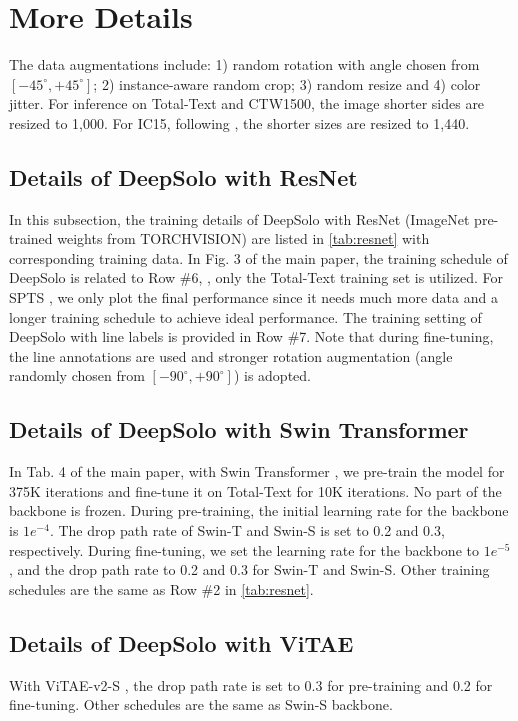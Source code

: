 \documentclass[10pt,twocolumn,letterpaper]{article}
\begin{document}
\section{More Details}
\label{sec:more_details}

The data augmentations include: 1) random rotation with angle chosen from $[-45^{\circ}, +45^{\circ}]$; 2) instance-aware random crop; 3) random resize and 4) color jitter. For inference on Total-Text and CTW1500, the image shorter sides are resized to 1,000. For IC15, following \cite{liao2020mask,zhang2022text}, the shorter sizes are resized to 1,440.

\subsection{Details of DeepSolo with ResNet}
In this subsection, the training details of DeepSolo with ResNet \cite{he2016deep} (ImageNet pre-trained weights from TORCHVISION) are listed in \cref{tab:resnet} with corresponding training data. In Fig. 3 of the main paper, the training schedule of DeepSolo is related to Row \#6, \ie, only the Total-Text training set is utilized. For SPTS \cite{peng2022spts}, we only plot the final performance since it needs much more data and a longer training schedule to achieve ideal performance. The training setting of DeepSolo with line labels is provided in Row \#7. Note that during fine-tuning, the line annotations are used and stronger rotation augmentation (angle randomly chosen from $[-90^{\circ}, +90^{\circ}]$) is adopted.

\subsection{Details of DeepSolo with Swin Transformer}
\label{sec:details_swin}
In Tab. 4 of the main paper, with Swin Transformer \cite{liu2021swin}, we pre-train the model for 375K iterations and fine-tune it on Total-Text for 10K iterations. No part of the backbone is frozen. During pre-training, the initial learning rate for the backbone is $1e^{-4}$. The drop path rate of Swin-T and Swin-S is set to 0.2 and 0.3, respectively. During fine-tuning, we set the learning rate for the backbone to $1e^{-5}$, and the drop path rate to 0.2 and 0.3 for Swin-T and Swin-S. Other training schedules are the same as Row \#2 in \cref{tab:resnet}.

\subsection{Details of DeepSolo with ViTAE}
With ViTAE-v2-S \cite{zhang2022vitaev2}, the drop path rate is set to 0.3 for pre-training and 0.2 for fine-tuning. Other schedules are the same as Swin-S backbone.
\end{document}

